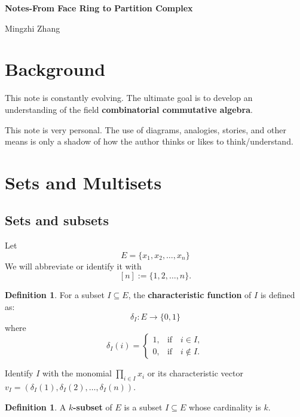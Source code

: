 \documentclass[12pt]{article}
\theoremstyle{definition}  %
\newtheorem{defi}[thm]{Definition}
\numberwithin{equation}{subsection}
\def\Prod{\textstyle\prod\limits}
\begin{document}
\setcounter{section}{-1}

\begin{center}
{\Large\bf 
Notes-From Face Ring to Partition Complex
}\\ [7pt]
\end{center}

\vskip 3mm

\begin{center}
Mingzhi Zhang
\end{center}

\vskip 3mm

\section{Background}
This note is constantly evolving. The ultimate goal is to develop an understanding of the field \textbf{combinatorial commutative algebra}.

This note is very personal. The use of diagrams, analogies, stories, and other means is only a shadow of how the author thinks or likes to think/understand.



\section{Sets and Multisets}

\subsection{Sets and subsets}
Let
\[
E = \{x_1, x_2, \ldots, x_n\}
\]
We will abbreviate or identify it with
\[
[n] := \{1, 2, \ldots, n\}.
\]

\begin{defi}
For a subset $I \subseteq E$, the \textbf{characteristic function} of $I$ is defined as:
\[
\delta_I : E \to \{0,1\}
\]
where
\[
\delta_I(i) = 
\begin{cases} 
1, & \text{if} \quad i \in I, \\
0, & \text{if} \quad i \notin I.
\end{cases}
\]     
\end{defi}


Identify $I$ with the monomial $\Prod_{i \in I}x_{i}$ or its characteristic vector $v_I = (\delta_I(1), \delta_I(2), \ldots, \delta_I(n))$.

\begin{defi}
    A \textbf{$k$-subset} of $E$ is a subset $I \subseteq E$ whose cardinality is $k$.
\end{defi}
\end{document}

